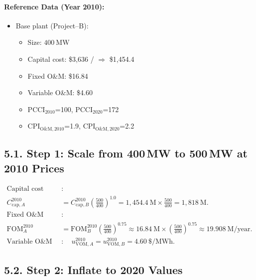 \documentclass[11pt]{article}
\begin{document}
\paragraph{Reference Data (Year 2010):}
\begin{itemize}
  \item Base plant (Project–B): 
    \begin{itemize}
      \item Size: \(400~\text{MW}\) 
      \item Capital cost: \$3{,}636 \;/ \(\Rightarrow\) \$1{,}454.4~ \)
      \item Fixed O\&M: \$16.84~
      \item Variable O\&M: \$4.60~
      \item PCCI\(_{2010}\)=100, PCCI\(_{2020}\)=172
      \item CPI\(_{\text{O\&M},2010}\)=1.9, CPI\(_{\text{O\&M},2020}\)=2.2
    \end{itemize}
\end{itemize}

\subsection*{5.1. Step 1: Scale from 400\,MW to 500\,MW at 2010 Prices}

\begin{align}
  \text{Capital cost (2010)}&: \nonumber\\
  C_{\mathrm{cap},A}^{2010}
  &= C_{\mathrm{cap},B}^{2010}
    \left(\frac{500}{400}\right)^{1.0}
  = 1{,}454.4~\text{M} \times \frac{500}{400}
  = 1{,}818~\text{M}.
  \label{eq:scale-cap} \\[1em]
  \text{Fixed O\&M (2010)}&: \nonumber\\
  \mathrm{FOM}_{A}^{2010}
  &= \mathrm{FOM}_{B}^{2010}
    \left(\frac{500}{400}\right)^{0.75}
  \approx 16.84~\text{M} \times \left(\frac{500}{400}\right)^{0.75}
  \approx 19.908~\text{M/year}.
  \label{eq:scale-fom} \\[1em]
  \text{Variable O\&M (2010)}&:
  \quad u_{\mathrm{VOM},A}^{2010} = u_{\mathrm{VOM},B}^{2010} = 4.60~\$/\text{MWh}.
  \label{eq:scale-vom}
\end{align}

\subsection*{5.2. Step 2: Inflate to 2020 Values}
\end{document}
